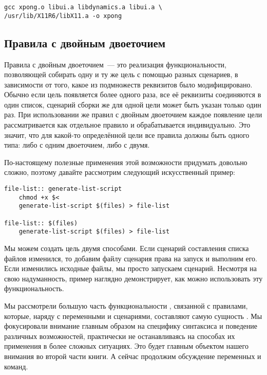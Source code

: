 \begin{verbatim}
gcc xpong.o libui.a libdynamics.a libui.a \
/usr/lib/X11R6/libX11.a -o xpong
\end{verbatim}

\subsection{Правила с двойным двоеточием}

Правила с двойным двоеточием~--- это реализация функциональности,
позволяющей собирать одну и ту же цель с помощью разных сценариев, в
зависимости от того, какое из подмножеств реквизитов было
модифицировано. Обычно если цель появляется более одного раза, все её
реквизиты соединяются в один список, сценарий сборки же для одной цели
может быть указан только один раз. При использовании же правил с
двойным двоеточием каждое появление цели рассматривается как отдельное
правило и обрабатывается индивидуально. Это значит, что для какой-то
определённой цели все правила должны быть одного типа: либо с одним
двоеточием, либо с двумя.

По-настоящему полезные применения этой возможности придумать довольно
сложно, поэтому давайте рассмотрим следующий искусственный пример:

{\footnotesize
\begin{verbatim}
file-list:: generate-list-script
    chmod +x $<
    generate-list-script $(files) > file-list

file-list:: $(files)
    generate-list-script $(files) > file-list
\end{verbatim}
}

Мы можем создать цель  двумя способами. Если
сценарий составления списка файлов изменился, то добавим файлу
сценария права на запуск и выполним его. Если изменились исходные
файлы, мы просто запускаем сценарий.  Несмотря на свою надуманность,
пример наглядно демонстрирует, как можно использовать эту
функциональность.

Мы рассмотрели большую часть функциональности \GNUmake{}, связанной с
правилами, которые, наряду с переменными и сценариями, составляют
самую сущность \GNUmake{}. Мы фокусировали внимание главным образом на
специфику синтаксиса и поведение различных возможностей, практически
не останавливаясь на способах их применения в более сложных ситуациях.
Это будет главным объектом нашего внимания во второй части книги. А
сейчас продолжим обсуждение переменных и команд.
